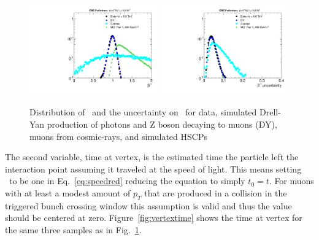 \begin{figure}
  \begin{center}
      \includegraphics[width=0.49\textwidth]{figures/timing/TOF}
      \includegraphics[width=0.49\textwidth]{figures/timing/TOFErr} \\
      \caption[Distribution of \invbeta\ and the uncertainty on \invbeta]
      {Distribution of \invbeta\ and the uncertainty on \invbeta\ for data,
simulated Drell-Yan production of photons and Z boson decaying to muons (DY), muons from cosmic-rays, and simulated HSCPs
        }
      \label{fig:invbeta}
  \end{center}
\end{figure}


The second variable, time at vertex, is the estimated time the particle 
left the interaction point assuming it traveled at the speed of light.
This means setting \invbeta\ to be one in Eq.~\ref{eq:speedred} reducing the equation to simply $t_0 = t$. 
For muons with at least a modest amount of $p_T$ that are produced in a collision in the triggered bunch crossing window this assumption is valid and thus the
value should be centered at zero. Figure~\ref{fig:vertextime} shows the time at vertex for the same three samples as in Fig.~\ref{fig:invbeta}.



